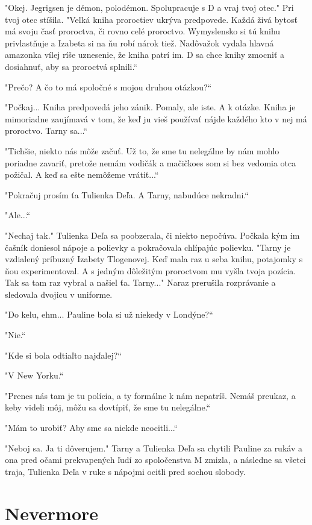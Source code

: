 \documentclass{book}
\begin{document}
"$ $Okej. Jegrigsen je démon, polodémon. Spolupracuje s D a vraj tvoj otec."$ $ Pri tvoj otec stíšila. "Veľká kniha proroctiev ukrýva predpovede. Každá živá bytosť má svoju časť proroctva, či rovno celé proroctvo. Wymyslensko si tú knihu privlastňuje a Izabeta si na ňu robí nárok tiež. Nadôvažok vydala hlavná amazonka vílej ríše uznesenie, že kniha patrí im. D sa chce knihy zmocniť a dosiahnuť, aby sa proroctvá splnili.“

"Prečo? A čo to má spoločné s mojou druhou otázkou?“

"Počkaj... Kniha predpovedá jeho zánik. Pomaly, ale iste. A k otázke. Kniha je mimoriadne zaujímavá v tom, že keď ju vieš používať nájde každého kto v nej má proroctvo. Tarny sa...“

"Tichšie, niekto nás môže začuť. Už to, že sme tu nelegálne by nám mohlo poriadne zavariť, pretože nemám vodičák a mačičkoes som si bez vedomia otca požičal. A keď sa ešte nemôžeme vrátiť...“

"Pokračuj prosím ťa Tulienka Deľa. A Tarny, nabudúce nekradni.“

"$ $Ale...“

"Nechaj tak."$ $ Tulienka Deľa sa poobzerala, či niekto nepočúva. Počkala kým im čašník doniesol nápoje a polievky a pokračovala chlípajúc polievku. "Tarny je vzdialený príbuzný Izabety Tlogenovej. Keď mala raz u seba knihu, potajomky s ňou experimentoval. A s jedným dôležitým proroctvom mu vyšla tvoja pozícia. Tak sa tam raz vybral a našiel ťa. Tarny..."$ $ Naraz prerušila rozprávanie a sledovala dvojicu v uniforme.

"Do kelu, ehm... Pauline bola si už niekedy v Londýne?“

"Nie.“

"Kde si bola odtiaľto najďalej?“

"V New Yorku.“

"Prenes nás tam je tu polícia, a ty formálne k nám nepatríš. Nemáš preukaz, a keby videli môj, môžu sa dovtípiť, že sme tu nelegálne.“

"Mám to urobiť? Aby sme sa niekde neocitli...“

"Neboj sa. Ja ti dôverujem."$ $ Tarny a Tulienka Deľa sa chytili Pauline za rukáv a ona pred očami prekvapených ľudí zo spoločenstva M zmizla, a následne sa všetci traja, Tulienka Deľa v ruke s nápojmi ocitli pred sochou slobody.


\newpage
\chapter{Nevermore}
\end{document}
